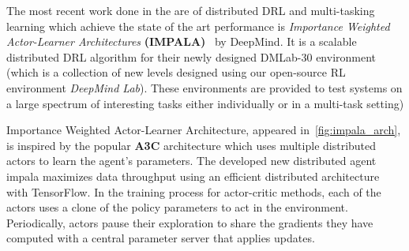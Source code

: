 The most recent work done in the are of distributed DRL and multi-tasking learning which achieve the state of the art performance is \textit{Importance Weighted Actor-Learner Architectures} \textbf{(IMPALA)}~\parencite{espeholt2018impala} by DeepMind. It is a scalable distributed DRL algorithm for their newly designed DMLab-30 environment (which is a collection of new levels designed using our open-source RL environment \textit{DeepMind Lab}). These environments are provided to test systems on a large spectrum of interesting tasks either individually or in a multi-task setting)

Importance Weighted Actor-Learner Architecture, appeared in~\ref{fig:impala_arch}, is inspired by the popular \textbf{A3C} architecture which uses multiple distributed actors to learn the agent’s parameters. The developed new distributed agent impala maximizes data throughput using an efficient distributed architecture with TensorFlow. 
In the training process for actor-critic methods, each of the actors uses a clone of the policy parameters to act in the environment. Periodically, actors pause their exploration to share the gradients they have computed with a central parameter server that applies updates. 

